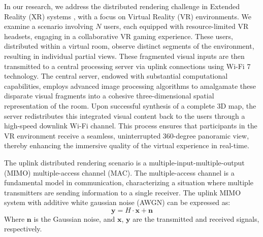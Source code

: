 In our research, we address the distributed rendering challenge in Extended Reality (XR) systems \cite{rendering1}, with a focus on Virtual Reality (VR) environments. We examine a scenario involving \( N \) users, each equipped with resource-limited VR headsets, engaging in a collaborative VR gaming experience. These users, distributed within a virtual room, observe distinct segments of the environment, resulting in individual partial views. These fragmented visual inputs are then transmitted to a central processing server via uplink connections using Wi-Fi 7 technology. The central server, endowed with substantial computational capabilities, employs advanced image processing algorithms to amalgamate these disparate visual fragments into a cohesive three-dimensional spatial representation of the room. Upon successful synthesis of a complete 3D map, the server redistributes this integrated visual content back to the users through a high-speed downlink Wi-Fi channel. This process ensures that participants in the VR environment receive a seamless, uninterrupted 360-degree panoramic view, thereby enhancing the immersive quality of the virtual experience in real-time.

The uplink distributed rendering scenario is a multiple-input-multiple-output (MIMO) multiple-access channel (MAC). The multiple-access channel is a fundamental model in communication, characterizing a situation where multiple transmitters are sending information to a single receiver. The uplink MIMO system with additive white gaussian noise (AWGN) can be expressed as:
\begin{equation}
    \boldsymbol{y} = H\cdot \boldsymbol{x} + \boldsymbol{n}
\end{equation}
Where $\boldsymbol{n}$ is the Gaussian noise, and $\boldsymbol{x}$, $\boldsymbol{y}$ are the transmitted and received signals, respectively. 


